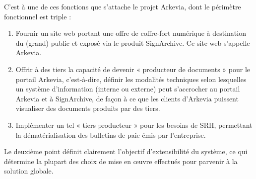 C’est à une de ces fonctions que s’attache  le projet  Arkevia,  dont  le périmètre fonctionnel est triple :
\begin{enumerate}
    \item Fournir un site web portant une offre de coffre-fort numérique à destination du (grand) public et exposé via le produit SignArchive. Ce site web s’appelle Arkevia.
    \item Offrir à des tiers la capacité de devenir « producteur de documents » pour le portail Arkevia, c’est-à-dire, définir les modalités techniques selon lesquelles un système d’information (interne ou externe) peut s’accrocher au portail Arkevia et à SignArchive,  de façon à ce que les clients d’Arkevia puissent visualiser des documents produits par des tiers.
    \item Implémenter un  tel « tiers producteur » pour les besoins de SRH, permettant la dématérialisation des bulletins de paie émis par l’entreprise.\\
\end{enumerate}

Le deuxième point définit clairement l'objectif d'extensibilité du système, ce qui détermine la plupart des choix de mise en œuvre effectués pour parvenir à la solution globale.


